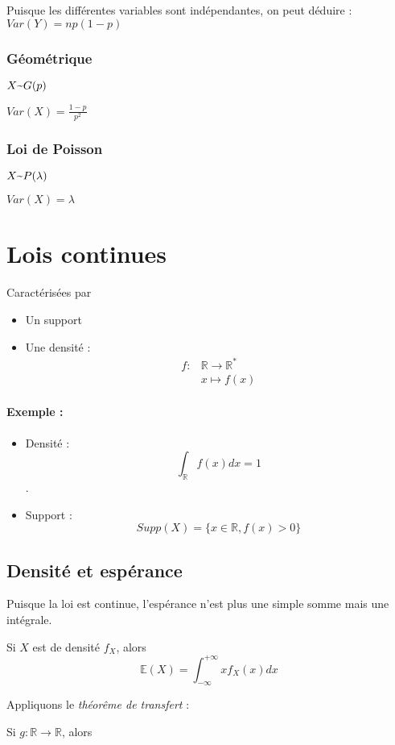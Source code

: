\documentclass{article}
\newcommand{\textapprox}{\raisebox{0.5ex}{\texttildelow}}
\begin{document}
Puisque les différentes variables sont indépendantes, on peut déduire :
$Var(Y) = np(1-p)$

\subsubsection{Géométrique}
$X \textapprox G(p)$

$Var(X) = \frac{1-p}{p^2}$

\subsubsection{Loi de Poisson}
$X \textapprox P(\lambda)$

$Var(X) = \lambda$

\section{Lois continues}

Caractérisées par
\begin{itemize}
  \item Un support
  \item Une densité :
  \begin{align*}
    f: &\mathbb{R} \to \mathbb{R}^{*} \\
    &x \mapsto f(x)
  \end{align*}
\end{itemize}

\paragraph{Exemple :}
\begin{itemize}
  \item Densité : $$ \int_{\mathbb{R}} f(x)dx = 1 $$.
  \item Support : $$ Supp(X) = \{ x \in \mathbb{R}, f(x) > 0 \}$$
\end{itemize}

\subsection{Densité et espérance}
Puisque la loi est continue, l'espérance n'est plus une simple somme mais une
intégrale.

Si $X$ est de densité $f_{X}$, alors $$\mathbb{E}(X) = \int_{- \infty}^{+ \infty} x f_{X}(x) dx$$

Appliquons le \textit{théorême de transfert} :

Si $g : \mathbb{R} \to \mathbb{R}$, alors
\end{document}
